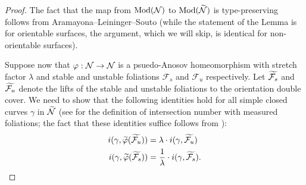 \begin{proof}
  The fact that the map from $\operatorname{Mod}(\mathcal{N})$ to $\operatorname{Mod}(\widetilde{\mathcal{N}})$ is type-preserving follows from Aramayona--Leininger--Souto \cite[Lemma 10]{aramayona2009injections} (while the statement of the Lemma is for orientable surfaces, the argument, which we will skip, is identical for non-orientable surfaces).

  Suppose now that $\varphi:\mathcal{N}\rightarrow\mathcal{N}$ is a psuedo-Anosov homeomorphism with stretch factor $\lambda$ and stable and unstable foliations $\mathcal{F}_s$ and $\mathcal{F}_u$ respectively.
  Let $\widetilde{\mathcal{F}_s}$ and $\widetilde{\mathcal{F}_u}$ denote the lifts of the stable and unstable foliations to the orientation double cover.
  We need to show that the following identities hold for all simple closed curves $\gamma$ in $\widetilde{\mathcal{N}}$ (see \cite[Expos\'e 5]{FLP} for the definition of intersection number with measured foliations; the fact that these identities suffice follows from \cite[Lemma 9.15]{FLP}):
  \begin{align}
      \label{eq:unstable-foliation}
      i(\gamma, \widetilde{\varphi}(\widetilde{\mathcal{F}_u})) &= \lambda \cdot i(\gamma, \widetilde{\mathcal{F}_u}) \\
      \label{eq:stable-foliation}
      i(\gamma, \widetilde{\varphi}(\widetilde{\mathcal{F}_s})) &= \frac{1}{\lambda} \cdot i(\gamma, \widetilde{\mathcal{F}_s}).
  \end{align}


\end{proof}
